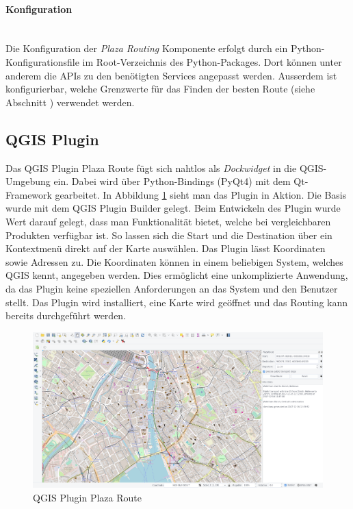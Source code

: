 \paragraph{Konfiguration}\label{impl:PlazaRouting_Konfiguration}~\\
Die Konfiguration der \emph{Plaza Routing} Komponente erfolgt durch ein Python-Konfigurationsfile im Root-Verzeichnis des Python-Packages. Dort können unter anderem die \ac{API}s zu den benötigten Services angepasst werden. Ausserdem ist konfigurierbar, welche Grenzwerte für das Finden der besten Route (siehe Abschnitt ) verwendet werden.

\subsection{QGIS Plugin}
\label{impl:QGIS Plugin}
Das QGIS Plugin Plaza Route \cite{github:PlazaRoute-qgis-plugin} fügt sich nahtlos als \emph{Dockwidget} in die QGIS-Umgebung ein. Dabei wird über Python-Bindings (PyQt4) mit dem Qt-Framework gearbeitet. In Abbildung \ref{fig:qgis_plugin_plaza_route} sieht man das Plugin in Aktion. Die Basis wurde mit dem QGIS Plugin Builder \cite{qgis_plugin_builder} gelegt. Beim Entwickeln des Plugin wurde Wert darauf gelegt, dass man Funktionalität bietet, welche bei vergleichbaren Produkten verfügbar ist. So lassen sich die Start und die Destination über ein Kontextmenü direkt auf der Karte auswählen. Das Plugin lässt Koordinaten sowie Adressen zu. Die Koordinaten können in einem beliebigen System, welches QGIS kennt, angegeben werden. Dies ermöglicht eine unkomplizierte Anwendung, da das Plugin keine speziellen Anforderungen an das System und den Benutzer stellt. Das Plugin wird installiert, eine Karte wird geöffnet und das Routing kann bereits durchgeführt werden.

\begin{figure}[ht]
\centering
\includegraphics[width=1.0\linewidth]{projectdoc/img/qgis_plugin_plaza_route}
\caption[QGIS Plugin Plaza Route]{QGIS Plugin Plaza Route}
\label{fig:qgis_plugin_plaza_route}
\end{figure}

